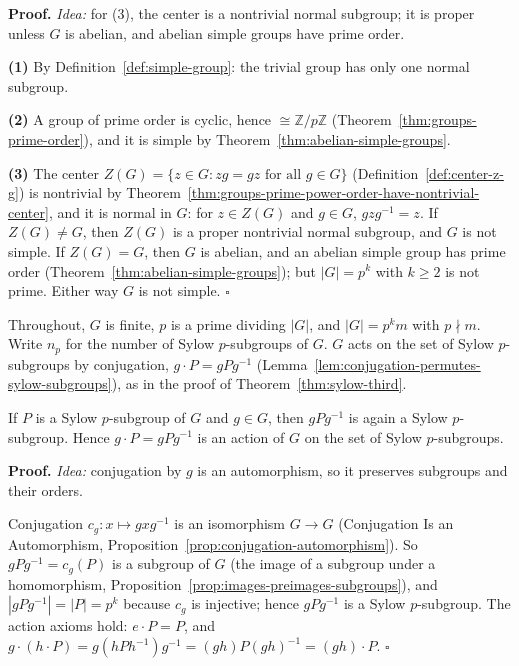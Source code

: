 \documentclass[11pt]{report}
\renewenvironment{proof}[1][Proof]{\noindent\textbf{#1.} }{\hfill$\square$\par\vspace{5pt}}
\begin{document}
\begin{proof}
\textit{Idea:} for (3), the center is a nontrivial normal subgroup; it is proper unless $G$ is abelian, and abelian simple groups have prime order.\par
\textbf{(1)} By Definition~\ref{def:simple-group}: the trivial group has only one normal subgroup.

\textbf{(2)} A group of prime order is cyclic, hence $\cong \mathbb{Z}/p\mathbb{Z}$ (Theorem~\ref{thm:groups-prime-order}), and it is simple by Theorem~\ref{thm:abelian-simple-groups}.

\textbf{(3)} The center $Z(G) = \{z \in G : zg = gz \text{ for all } g \in G\}$ (Definition~\ref{def:center-z-g}) is nontrivial by Theorem~\ref{thm:groups-prime-power-order-have-nontrivial-center}, and it is normal in $G$: for $z \in Z(G)$ and $g \in G$, $gzg^{-1} = z$. If $Z(G) \neq G$, then $Z(G)$ is a proper nontrivial normal subgroup, and $G$ is not simple. If $Z(G) = G$, then $G$ is abelian, and an abelian simple group has prime order (Theorem~\ref{thm:abelian-simple-groups}); but $|G| = p^k$ with $k \geq 2$ is not prime. Either way $G$ is not simple.
\end{proof}

\begin{rembox}\label{rem:small-simple-notation}
Throughout, $G$ is finite, $p$ is a prime dividing $|G|$, and $|G| = p^k m$ with $p \nmid m$. Write $n_p$ for the number of Sylow $p$-subgroups of $G$. $G$ acts on the set of Sylow $p$-subgroups by conjugation, $g \cdot P = gPg^{-1}$ (Lemma~\ref{lem:conjugation-permutes-sylow-subgroups}), as in the proof of Theorem~\ref{thm:sylow-third}.
\end{rembox}

\begin{lembox}\label{lem:conjugation-permutes-sylow-subgroups}
If $P$ is a Sylow $p$-subgroup of $G$ and $g \in G$, then $gPg^{-1}$ is again a Sylow $p$-subgroup. Hence $g \cdot P = gPg^{-1}$ is an action of $G$ on the set of Sylow $p$-subgroups.
\end{lembox}

\begin{proof}
\textit{Idea:} conjugation by $g$ is an automorphism, so it preserves subgroups and their orders.\par
Conjugation $c_g: x \mapsto gxg^{-1}$ is an isomorphism $G \to G$ (Conjugation Is an Automorphism, Proposition~\ref{prop:conjugation-automorphism}). So $gPg^{-1} = c_g(P)$ is a subgroup of $G$ (the image of a subgroup under a homomorphism, Proposition~\ref{prop:images-preimages-subgroups}), and $|gPg^{-1}| = |P| = p^k$ because $c_g$ is injective; hence $gPg^{-1}$ is a Sylow $p$-subgroup. The action axioms hold: $e \cdot P = P$, and $g \cdot (h \cdot P) = g(hPh^{-1})g^{-1} = (gh)P(gh)^{-1} = (gh) \cdot P$.
\end{proof}
\end{document}
